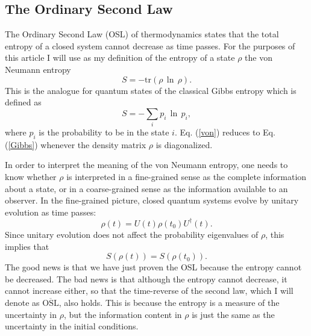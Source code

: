 \documentclass{article}
\begin{document}
\subsection{The Ordinary Second Law}\label{OSL}

The Ordinary Second Law (OSL) of thermodynamics states that the total entropy of a closed system cannot decrease as time passes.  For the purposes of this article I will use as my definition of the entropy of a state $\rho$ the von Neumann entropy
\begin{equation}\label{von}
S = -\mathrm{tr}(\rho\,\ln\,\rho).
\end{equation}
This is the analogue for quantum states of the classical Gibbs entropy which is defined as
\begin{equation}\label{Gibbs}
S = -\sum_i p_i\,\ln\,p_i,
\end{equation}
where $p_i$ is the probability to be in the state $i$.  Eq. (\ref{von}) reduces to Eq. (\ref{Gibbs}) whenever the density matrix $\rho$ is diagonalized.

In order to interpret the meaning of the von Neumann entropy, one needs to know whether $\rho$ is interpreted in a fine-grained sense as the complete information about a state, or in a coarse-grained sense as the information available to an observer.  In the fine-grained picture, closed quantum systems evolve by unitary evolution as time passes:
\begin{equation}\label{unitary}
\rho(t) = U(t) \rho(t_0) U^\dagger(t).
\end{equation}
Since unitary evolution does not affect the probability eigenvalues of $\rho$, this implies that
\begin{equation}
S(\rho(t)) = S(\rho(t_0)).
\end{equation}
The good news is that we have just proven the OSL because the entropy cannot be decreased.  The bad news is that although the entropy cannot decrease, it cannot increase either, so that the time-reverse of the second law, which I will denote as $\overline{\mathrm{OSL}}$, also holds.  This is because the entropy is a measure of the uncertainty in $\rho$, but the information content in $\rho$ is just the same as the uncertainty in the initial conditions.
\end{document}
